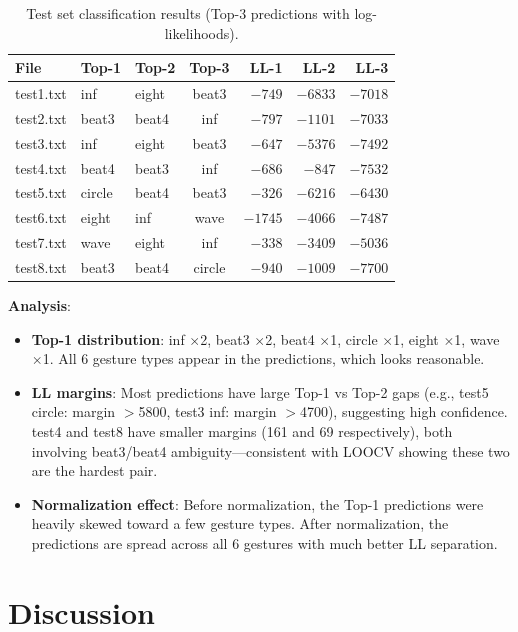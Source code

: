 \documentclass[11pt]{article}
\begin{document}
\begin{table}[H]
\centering
\caption{Test set classification results (Top-3 predictions with log-likelihoods).}
\label{tab:test}
\begin{tabular}{@{}lllcrrr@{}}
\toprule
File & Top-1 & Top-2 & Top-3 & LL-1 & LL-2 & LL-3 \\
\midrule
test1.txt & inf    & eight & beat3  & $-749$   & $-6833$  & $-7018$ \\
test2.txt & beat3  & beat4 & inf    & $-797$   & $-1101$  & $-7033$ \\
test3.txt & inf    & eight & beat3  & $-647$   & $-5376$  & $-7492$ \\
test4.txt & beat4  & beat3 & inf    & $-686$   & $-847$   & $-7532$ \\
test5.txt & circle & beat4 & beat3  & $-326$   & $-6216$  & $-6430$ \\
test6.txt & eight  & inf   & wave   & $-1745$  & $-4066$  & $-7487$ \\
test7.txt & wave   & eight & inf    & $-338$   & $-3409$  & $-5036$ \\
test8.txt & beat3  & beat4 & circle & $-940$   & $-1009$  & $-7700$ \\
\bottomrule
\end{tabular}
\end{table}

\textbf{Analysis}:
\begin{itemize}[nosep]
    \item \textbf{Top-1 distribution}: inf $\times$2, beat3 $\times$2, beat4 $\times$1, circle $\times$1, eight $\times$1, wave $\times$1. All 6 gesture types appear in the predictions, which looks reasonable.
    \item \textbf{LL margins}: Most predictions have large Top-1 vs Top-2 gaps (e.g., test5 circle: margin $>$5800, test3 inf: margin $>$4700), suggesting high confidence. test4 and test8 have smaller margins (161 and 69 respectively), both involving beat3/beat4 ambiguity---consistent with LOOCV showing these two are the hardest pair.
    \item \textbf{Normalization effect}: Before normalization, the Top-1 predictions were heavily skewed toward a few gesture types. After normalization, the predictions are spread across all 6 gestures with much better LL separation.
\end{itemize}


\section{Discussion}
\end{document}

